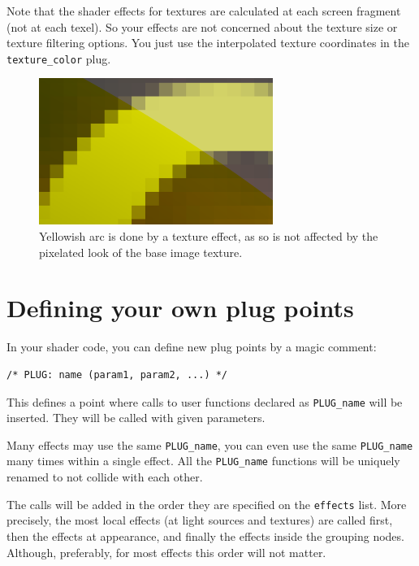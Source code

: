 \documentclass{acmsiggraph}                     %
\newenvironment{mycode}
{\begin{mycodecore}}
{\end{mycodecore}
\vspace{-0.1in}}
\begin{document}
Note that the shader effects for textures are calculated at each screen fragment
(not at each texel). So your effects are not concerned about the texture size
or texture filtering options. You just use the interpolated texture
coordinates in the \texttt{texture\_color} plug.

\begin{figure}[H]
  \centering
  \includegraphics[width=3in]{shader_texture_no_filtering_problems}
  \caption{Yellowish arc is done by a texture effect, as so is not
    affected by the pixelated look of the base image texture.}
\end{figure}

\section{Defining your own plug points}

In your shader code, you can define new plug points by a
magic comment:

\begin{mycode}
\begin{Verbatim}[commandchars=\\\{\}]
/* PLUG: name (param1, param2, ...) */
\end{Verbatim}
\end{mycode}

This defines a point where calls to user functions declared as
\texttt{PLUG\_name} will be inserted. They will be called with given
parameters.

Many effects may use the same \texttt{PLUG\_name},
you can even use the same \texttt{PLUG\_name} many times within a single
effect. All the \texttt{PLUG\_name} functions
will be uniquely renamed to not collide with each other.

The calls will be added in the order they are specified on the
\texttt{effects} list. More precisely, the most local effects
(at light sources and textures) are called first, then the effects
at appearance, and finally the effects inside the grouping nodes.
Although, preferably, for most effects this order will not matter.
\end{document}
